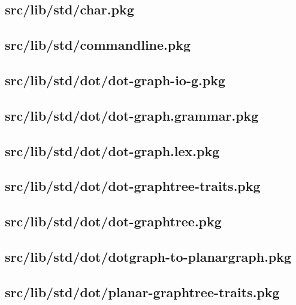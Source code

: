 \subsection{src/lib/std/char.pkg}


\subsection{src/lib/std/commandline.pkg}


\subsection{src/lib/std/dot/dot-graph-io-g.pkg}


\subsection{src/lib/std/dot/dot-graph.grammar.pkg}


\subsection{src/lib/std/dot/dot-graph.lex.pkg}


\subsection{src/lib/std/dot/dot-graphtree-traits.pkg}


\subsection{src/lib/std/dot/dot-graphtree.pkg}


\subsection{src/lib/std/dot/dotgraph-to-planargraph.pkg}


\subsection{src/lib/std/dot/planar-graphtree-traits.pkg}


